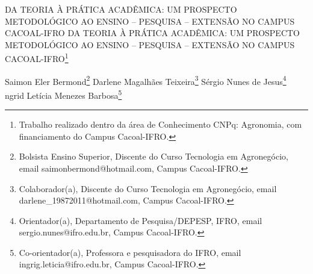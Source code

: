 \documentclass[article,12pt,onesidea,4paper,english,brazil]{abntex2}
\begin{document}
	
	
	\frenchspacing 
	
	\begin{center}
		\LARGE DA TEORIA À PRÁTICA ACADÊMICA: UM PROSPECTO METODOLÓGICO AO
		ENSINO – PESQUISA – EXTENSÃO NO CAMPUS CACOAL-IFRO DA TEORIA À
		PRÁTICA ACADÊMICA: UM PROSPECTO METODOLÓGICO AO ENSINO –
		PESQUISA – EXTENSÃO NO CAMPUS CACOAL-IFRO\footnote{Trabalho realizado dentro da área de Conhecimento CNPq: Agronomia, com financiamento do
			Campus Cacoal-IFRO.}
		
		\normalsize
		Saimon Eler Bermond\footnote{Bolsista Ensino Superior, Discente do Curso Tecnologia em Agronegócio, email
			saimonbermond@hotmail.com, Campus Cacoal-IFRO.} 
		Darlene Magalhães Teixeira\footnote{Colaborador(a), Discente do Curso Tecnologia em Agronegócio, email
			darlene\_19872011@hotmail.com, Campus Cacoal-IFRO.} 
		Sérgio Nunes de Jesus\footnote{Orientador(a), Departamento de Pesquisa/DEPESP, IFRO, email sergio.nunes@ifro.edu.br, Campus
			Cacoal-IFRO.} 
		ngrid Letícia
		Menezes Barbosa\footnote{Co-orientador(a), Professora e pesquisadora do IFRO, email ingrig.leticia@ifro.edu.br, Campus
			Cacoal-IFRO.} 
	\end{center}
	
\end{document}
